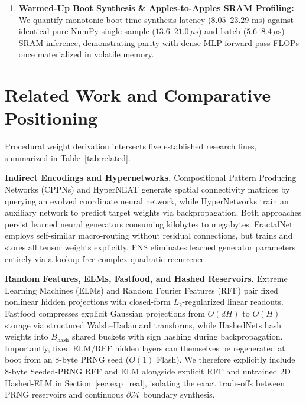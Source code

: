 \begin{enumerate}
    \item \textbf{Warmed-Up Boot Synthesis \& Apples-to-Apples SRAM Profiling:} We quantify monotonic boot-time synthesis latency ($8.05\text{--}23.29\text{ ms}$) against identical pure-NumPy single-sample ($13.6\text{--}21.0\,\mu\text{s}$) and batch ($5.6\text{--}8.4\,\mu\text{s}$) SRAM inference, demonstrating parity with dense MLP forward-pass FLOPs once materialized in volatile memory.
\end{enumerate}

\section{Related Work and Comparative Positioning}
\label{sec:related}

Procedural weight derivation intersects five established research lines, summarized in Table~\ref{tab:related}.

\textbf{Indirect Encodings and Hypernetworks.} Compositional Pattern Producing Networks (CPPNs) and HyperNEAT \cite{stanley2009hyperneat} generate spatial connectivity matrices by querying an evolved coordinate neural network, while HyperNetworks \cite{ha2017hypernetworks} train an auxiliary network to predict target weights via backpropagation. Both approaches persist learned neural generators consuming kilobytes to megabytes. FractalNet \cite{larsson2017fractalnet} employs self-similar macro-routing without residual connections, but trains and stores all tensor weights explicitly. FNS eliminates learned generator parameters entirely via a lookup-free complex quadratic recurrence.

\textbf{Random Features, ELMs, Fastfood, and Hashed Reservoirs.} Extreme Learning Machines (ELMs) \cite{huang2006extreme,huang2006universal} and Random Fourier Features (RFF) \cite{rahimi2007random,sutherland2015error} pair fixed nonlinear hidden projections with closed-form $L_2$-regularized linear readouts. Fastfood \cite{le2013fastfood} compresses explicit Gaussian projections from $O(dH)$ to $O(H)$ storage via structured Walsh--Hadamard transforms, while HashedNets \cite{chen2015hashednets} hash weights into $B_{\mathrm{hash}}$ shared buckets with sign hashing during backpropagation. Importantly, fixed ELM/RFF hidden layers can themselves be regenerated at boot from an $8\text{-byte}$ PRNG seed ($O(1)$ Flash). We therefore explicitly include $8\text{-byte}$ Seeded-PRNG RFF and ELM alongside explicit RFF and untrained 2D Hashed-ELM in Section~\ref{sec:exp_real}, isolating the exact trade-offs between PRNG reservoirs and continuous $\partial\mathcal{M}$ boundary synthesis.

